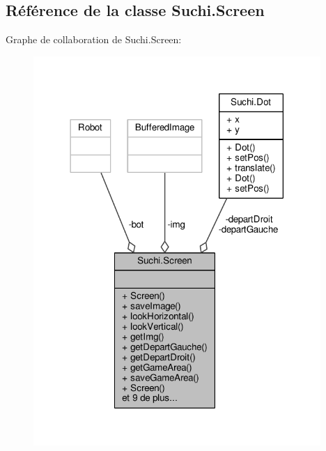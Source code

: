 \hypertarget{classSuchi_1_1Screen}{}\subsection{Référence de la classe Suchi.\+Screen}
\label{classSuchi_1_1Screen}


Graphe de collaboration de Suchi.\+Screen\+:\nopagebreak
\begin{figure}[H]
\begin{center}
\leavevmode
\includegraphics[width=309pt]{classSuchi_1_1Screen__coll__graph}
\end{center}
\end{figure}
